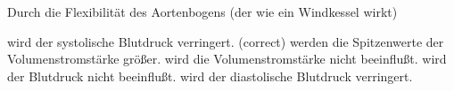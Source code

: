\documentclass[11pt]{exam}
\begin{document}
\begin{questions}
\vspace{3mm}\question Durch die Flexibilität des Aortenbogens (der wie ein Windkessel wirkt)

\begin{choices}
	\choice wird der systolische Blutdruck verringert. (correct)
	\choice werden die Spitzenwerte der Volumenstromstärke größer.
	\choice wird die Volumenstromstärke nicht beeinflußt.
	\choice wird der Blutdruck nicht beeinflußt.
	\choice wird der diastolische Blutdruck verringert.
\end{choices}

\vspace{3mm}\end{questions}
\end{document}
